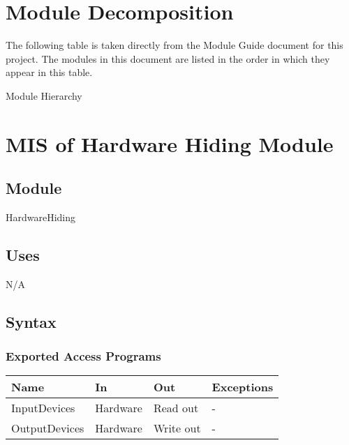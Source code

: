 \documentclass[12pt, titlepage]{article}
\begin{document}
\section{Module Decomposition}

The following table is taken directly from the Module Guide document for this
project. The modules in this document are listed in the order in which they
appear in this table.

\begin{table}[h!]
    \centering
    
    \caption{Module Hierarchy}
    \label{TblMH}
\end{table}

\newpage

\section{MIS of Hardware Hiding Module} \label{Mod:HH}


\subsection{Module}
HardwareHiding

\subsection{Uses}
N/A

\subsection{Syntax}

\subsubsection{Exported Access Programs}

\begin{center}
    \begin{tabular}{p{3cm} p{4cm} p{4cm} p{2cm}}
        \hline
        \textbf{Name} & \textbf{In} & \textbf{Out} & \textbf{Exceptions} \\
        \hline
        InputDevices & Hardware & Read out & - \\
        OutputDevices & Hardware & Write out & - \\
        \hline
    \end{tabular}
\end{center}
\end{document}
